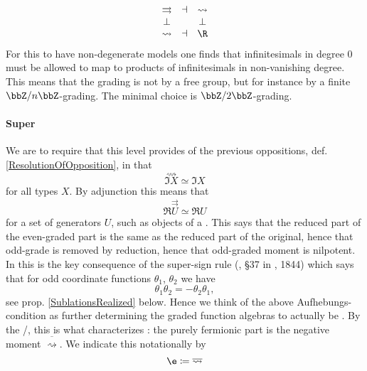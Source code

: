\documentclass[12pt,titlepage]{article}
\newcommand{\itexarray}[1]{\begin{matrix}#1\end{matrix}}
\theoremstyle{plain}
\theoremstyle{definition}
\theoremstyle{remark}
\begin{document}
\begin{displaymath}
\itexarray{
\rightrightarrows &\dashv& \rightsquigarrow
\\
\bot && \bot
\\
\rightsquigarrow &\dashv& \R
}
\end{displaymath}
For this to have non-degenerate models one finds that infinitesimals in degree 0 must be allowed to map to products of infinitesimals in non-vanishing degree. This means that the grading is not by a free group, but for instance by a finite  $\bbZ/n\bbZ$-grading. The minimal choice is $\bbZ/2\bbZ$-grading.
\hypertarget{FormalizationSuperGrading}{}\paragraph*{{Super}}\label{FormalizationSuperGrading}
We are to require that this level provides  of the previous oppositions, def. \ref{ResolutionOfOpposition}, in that
\begin{displaymath}
\stackrel{\rightsquigarrow}{\Im X} \simeq \Im X
\end{displaymath}
for all types $X$. By adjunction this means that
\begin{displaymath}
\Re \stackrel{\rightrightarrows}{U} \simeq \Re U
\end{displaymath}
for a set of generators $U$, such as objects of a .
This says that the reduced part of the even-graded part is the same as the reduced part of the original, hence that odd-grade is removed by reduction, hence that odd-graded moment is nilpotent. In  this is the key consequence of the super-sign rule (, §37 in , 1844) which says that for odd coordinate functions $\theta_1$, $\theta_2$ we have
\begin{displaymath}
\theta_1 \theta_2 = -\theta_2 \theta_1
,
\end{displaymath}
see prop. \ref{SublationsRealized} below.
Hence we think of the above Aufhebungs-condition as further determining the graded function algebras to actually be .
By the /, this is what characterizes : the purely fermionic part is the negative moment $\overline{\rightsquigarrow}$.
We indicate this notationally by
\begin{displaymath}
\e \coloneqq \overline{\rightsquigarrow}
\end{displaymath}
\end{document}

